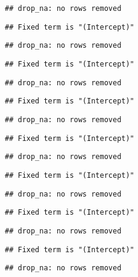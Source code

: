 \documentclass[
]{article}
\begin{document}
\begin{verbatim}
## drop_na: no rows removed
\end{verbatim}

\begin{verbatim}
## Fixed term is "(Intercept)"
\end{verbatim}

\begin{verbatim}
## drop_na: no rows removed
\end{verbatim}

\begin{verbatim}
## Fixed term is "(Intercept)"
\end{verbatim}

\begin{verbatim}
## drop_na: no rows removed
\end{verbatim}

\begin{verbatim}
## Fixed term is "(Intercept)"
\end{verbatim}

\begin{verbatim}
## drop_na: no rows removed
\end{verbatim}

\begin{verbatim}
## Fixed term is "(Intercept)"
\end{verbatim}

\begin{verbatim}
## drop_na: no rows removed
\end{verbatim}

\begin{verbatim}
## Fixed term is "(Intercept)"
\end{verbatim}

\begin{verbatim}
## drop_na: no rows removed
\end{verbatim}

\begin{verbatim}
## Fixed term is "(Intercept)"
\end{verbatim}

\begin{verbatim}
## drop_na: no rows removed
\end{verbatim}

\begin{verbatim}
## Fixed term is "(Intercept)"
\end{verbatim}

\begin{verbatim}
## drop_na: no rows removed
\end{verbatim}
\end{document}
